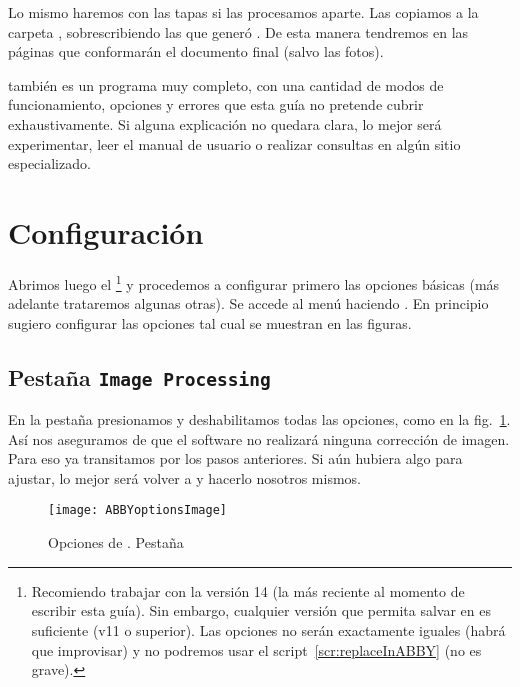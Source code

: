 \documentclass[%
	a5paper,
	10pt,
	twoside,
	openright,
	final,
]{memoir}
\begin{document}
	Lo mismo haremos con las tapas si las procesamos aparte. Las copiamos a la carpeta , sobrescribiendo las que generó \scantailor. De esta manera tendremos en  las páginas que conformarán el documento final (salvo las fotos).

	 \abby también es un programa muy completo, con una cantidad de modos de funcionamiento, opciones y errores que esta guía no pretende cubrir exhaustivamente. Si alguna explicación no quedara clara, lo mejor será experimentar, leer el manual de usuario o realizar consultas en algún sitio especializado.

	\section{Configuración} Abrimos luego el \abby\footnote{Recomiendo trabajar con la versión 14 (la más reciente al momento de escribir esta guía). Sin embargo, cualquier versión que permita salvar en \djvu es suficiente (v11 o superior). Las opciones no serán exactamente iguales (habrá que improvisar) y no podremos usar el script~\ref{scr:replaceInABBY} (no es grave).} y procedemos a configurar primero las opciones básicas (más adelante trataremos algunas otras). Se accede al menú haciendo . En principio sugiero configurar las opciones tal cual se muestran en las figuras.

	\subsection{Pestaña \texttt{Image Processing}} En la pestaña  presionamos  y deshabilitamos todas las opciones, como en la fig.~\ref{fig:ABBYoptionsImage}. Así nos aseguramos de que el software no realizará ninguna corrección de imagen. Para eso ya transitamos por los pasos anteriores. Si aún hubiera algo para ajustar, lo mejor será volver a \scantailor y hacerlo nosotros mismos.

	\begin{figure}
		\centering
		\texttt{[image: ABBYoptionsImage]}
		\caption[Opciones de \abby. Pestaña Image Processing]{Opciones de \abby. Pestaña \label{fig:ABBYoptionsImage}}
	\end{figure}
\end{document}
